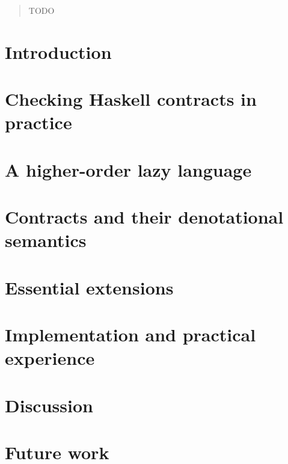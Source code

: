 \documentclass[preprint,nocopyrightspace,draft]{sigplanconf}
\begin{document}
\begin{abstract}
TODO
\end{abstract} 


\section{Introduction}\label{s:intro}
  

\section{Checking Haskell contracts in practice}\label{s:examples}
  


\section{A higher-order lazy language}\label{sect:language}
  

\section{Contracts and their denotational semantics}\label{sect:contracts}
  

\section{Essential extensions}\label{sect:extensions}
  

\section{Implementation and practical experience}\label{sect:implementation}
  

\section{Discussion}\label{sect:discussion}
  
\section{Future work}\label{sect:future}
  



\end{document}
